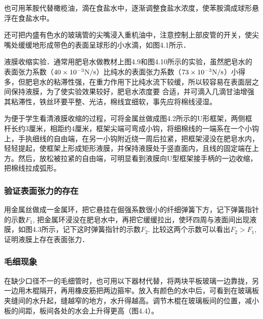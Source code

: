 也可用苯胺代替橄榄油，滴在食盐水中，逐渐调整食盐水浓度，使苯胺滴成球形悬浮在食盐水中。

还可把内盛有色水的玻璃管的尖嘴浸入重机油中，注意控制上部皮管的开关，使尖嘴处缓缓地形成带色的表面呈球形的小水滴，如图4.1所示．
\begin{figure}[htp]
    \centering
    \caption{}
\end{figure}

液膜收缩实验．通常用肥皂水做教材上图4.9和图4.10所示的实验，虽然肥皂水的表面张力系数（$40\times10^{-3}{\rm N/s}$）比纯水的表面张力系数（$73\times10^{-3}{\rm N/s}$）小得多，但肥皂水的粘滞性强，在重力作用下比纯水流下较缓，所以较容易在表面层之间保持液膜，为了使实验效果较好，肥皂水浓度要
合适，并可滴入几滴甘油增强其粘滞性，铁丝环要平整、光洁，棉线宜细软，事先应将棉线浸湿。

为便于学生看清液膜收缩的过程，可将金属丝做成图4.2所示的U形框架，两侧框杆长约3厘米，相距约4厘米，框架尖端可弯成小钩，将细棉线的一端系在一个小钩上，手执细线的自由端，在另一小钩附近绕一周后拉紧，把框架浸没在肥皂水内，轻轻提起，使框架上形成矩形液膜，并保持液膜处于竖直面内，且线的固定端在上方。然后，放松被拉紧的自由端，可明显看到液膜向U型框架接手柄的一边收缩，把棉线拉成弧形。

\begin{figure}[htp]
    \centering
    \caption{}
\end{figure}

\subsubsection{验证表面张力的存在}

用金属丝做成一金属环，把它悬挂在倔强系数很小的纤细弹簧下方，记下弹簧指针的示数$F_1$, 把金属环浸没在肥皂水中，再把它缓缓拉出，使环四周与液面间出现液膜，如图4.3所示，记下这时弹簧指针的示数$F_2$. 比较这两个示数可以看出$F_2>F_1$, 证明液膜上存在表面张力．

\subsubsection{毛细现象}

在缺少口径不一的毛细管时，也可用以下器材代替，将两块平板玻璃一边靠拢，另一边用木棍隔开，再用橡皮筋把两边箍牢。放入有颜色的水中后，可看到在玻璃板夹缝间的水升起，缝越窄的地方，水升得越高。调节木棍在玻璃板间的位置，减小板的间距，板间各处的水会上升得更高（图4.4）。

\begin{figure}[htp]
    \centering
    \caption{}
\end{figure}

